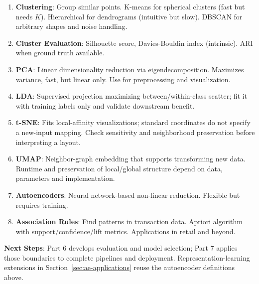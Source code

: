 \documentclass[11pt,twoside]{article}
\numberwithin{equation}{section}
\theoremstyle{plain}
\theoremstyle{definition}
\theoremstyle{remark}
\begin{document}
\begin{tcolorbox}[colback=yellow!10!white,colframe=orange!75!black,title=Key Takeaways]
\begin{enumerate}
\item \textbf{Clustering}: Group similar points. K-means for spherical clusters (fast but needs $K$). Hierarchical for dendrograms (intuitive but slow). DBSCAN for arbitrary shapes and noise handling.

\item \textbf{Cluster Evaluation}: Silhouette score, Davies-Bouldin index (intrinsic). ARI when ground truth available.

\item \textbf{PCA}: Linear dimensionality reduction via eigendecomposition. Maximizes variance, fast, but linear only. Use for preprocessing and visualization.

\item \textbf{LDA}: Supervised projection maximizing between/within-class scatter; fit it with training labels only and validate downstream benefit.

\item \textbf{t-SNE}: Fits local-affinity visualizations; standard coordinates do not specify a new-input mapping. Check sensitivity and neighborhood preservation before interpreting a layout.

\item \textbf{UMAP}: Neighbor-graph embedding that supports transforming new data. Runtime and preservation of local/global structure depend on data, parameters and implementation.

\item \textbf{Autoencoders}: Neural network-based non-linear reduction. Flexible but requires training.

\item \textbf{Association Rules}: Find patterns in transaction data. Apriori algorithm with support/confidence/lift metrics. Applications in retail and beyond.
\end{enumerate}

\textbf{Next Steps}: Part 6 develops evaluation and model selection; Part 7 applies those boundaries to complete pipelines and deployment. Representation-learning extensions in Section~\ref{sec:ae-applications} reuse the autoencoder definitions above.
\end{tcolorbox}
\end{document}
